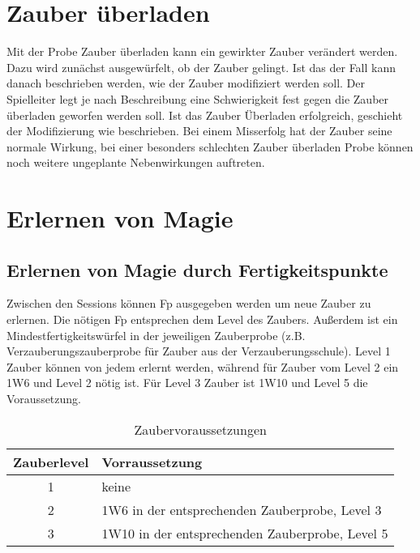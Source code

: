 \documentclass[../../Heldenanleitung2]{subfiles}
\begin{document}
\section{Zauber überladen}

Mit der Probe Zauber überladen kann ein gewirkter Zauber verändert werden. Dazu wird zunächst ausgewürfelt, ob der Zauber gelingt. Ist das der Fall kann danach beschrieben werden, wie der Zauber modifiziert werden soll. Der Spielleiter legt je nach Beschreibung eine Schwierigkeit fest gegen die Zauber überladen geworfen werden soll. Ist das Zauber Überladen erfolgreich, geschieht der Modifizierung wie beschrieben. Bei einem Misserfolg hat der Zauber seine normale Wirkung, bei einer besonders schlechten Zauber überladen Probe können noch weitere ungeplante Nebenwirkungen auftreten.

\section{Erlernen von Magie}


\subsection{Erlernen von Magie durch Fertigkeitspunkte}

Zwischen den Sessions können Fp ausgegeben werden um neue Zauber zu erlernen. Die nötigen Fp entsprechen dem Level des Zaubers. Außerdem ist ein Mindestfertigkeitswürfel in der jeweiligen Zauberprobe (z.B. Verzauberungszauberprobe für Zauber aus der Verzauberungsschule). Level 1 Zauber können von jedem erlernt werden, während für Zauber vom Level 2 ein 1W6 und Level 2 nötig ist. Für Level 3 Zauber ist 1W10 und Level 5 die Voraussetzung.

{
\begin{table}[h!]
\centering
\caption{Zaubervoraussetzungen}
\begin{tabular}{|cl|}
\hline
\textbf{Zauberlevel} & \textbf{Vorraussetzung}\\ \hline
1 & keine\\
2 & 1W6 in der entsprechenden Zauberprobe, Level 3\\
3 & 1W10 in der entsprechenden Zauberprobe, Level 5\\ \hline
\end{tabular}
\end{table}
}
\end{document}
